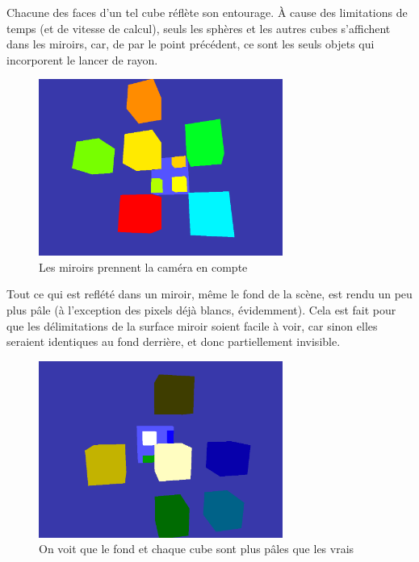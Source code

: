 \smallskip

Chacune des faces d'un tel cube réflète son entourage. À cause des limitations de temps (et de vitesse de calcul), seuls les sphères et les autres cubes s'affichent dans les miroirs, car, de par le point précédent, ce sont les seuls objets qui incorporent le lancer de rayon.

\begin{figure}[h]
	\centering
	\includegraphics[width=8cm]{fig/CubeReflection2.png}
	\caption{Les miroirs prennent la caméra en compte}
	\label{fig:propriete}
\end{figure}

\smallskip

Tout ce qui est reflété dans un miroir, même le fond de la scène, est rendu un peu plus pâle (à l'exception des pixels déjà blancs, évidemment). Cela est fait pour que les délimitations de la surface miroir soient facile à voir, car sinon elles seraient identiques au fond derrière, et donc partiellement invisible.

\begin{figure}[h]
	\centering
	\includegraphics[width=8cm]{fig/CubeReflection3.png}
	\caption{On voit que le fond et chaque cube sont plus pâles que les vrais}
	\label{fig:propriete}
\end{figure}

